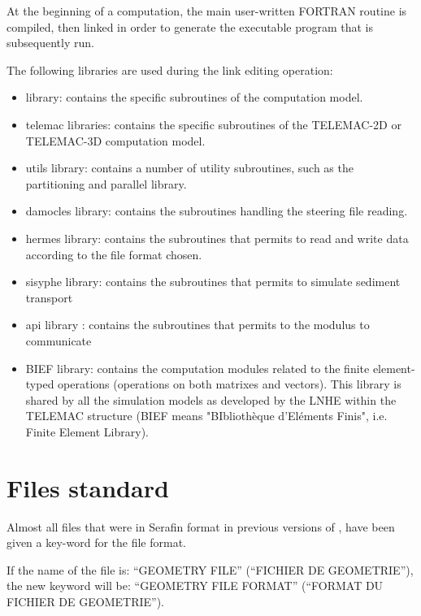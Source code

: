  At the beginning of a computation, the main user-written FORTRAN routine is compiled, then linked in order to generate the executable program that is subsequently run.

 The following libraries are used during the link editing operation:

\begin{itemize}
\item  \tomawac library: contains the specific subroutines of the \tomawac computation model.

\item  telemac libraries: contains the specific subroutines of the TELEMAC-2D or TELEMAC-3D computation model.

\item  utils library: contains a number of utility subroutines, such as the partitioning and parallel library.

\item  damocles library: contains the subroutines handling the steering file reading.

\item  hermes library: contains the subroutines that permits to read and write data according to the file format chosen.

\item  sisyphe library: contains the subroutines that permits to simulate sediment transport

\item  api library : contains the subroutines that permits to the modulus to communicate

\item  BIEF library: contains the computation modules related to the finite element-typed operations (operations on both matrixes and vectors). This library is shared by all the simulation models as developed by the LNHE within the TELEMAC structure (BIEF means "BIbliothèque d'Eléments Finis", i.e. Finite Element Library).
\end{itemize}



\section{ Files standard}

 Almost all files that were in Serafin format in previous versions of \tomawac, have been given a key-word for the file format.

 If the name of the file is: ``GEOMETRY FILE'' (``FICHIER DE GEOMETRIE''), the new keyword will be: ``GEOMETRY FILE FORMAT'' (``FORMAT DU FICHIER DE GEOMETRIE'').


